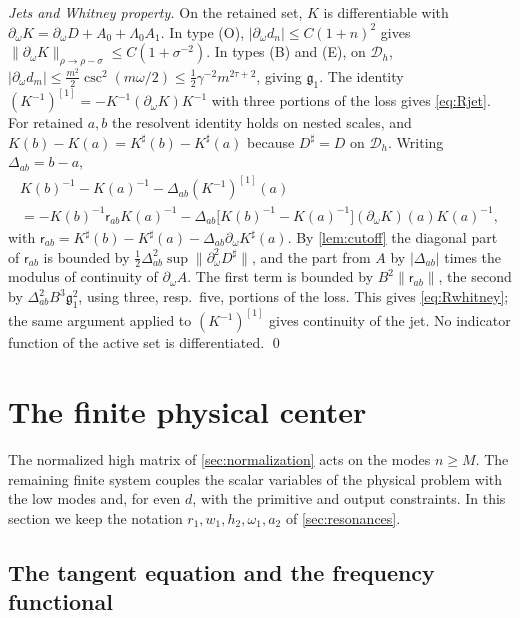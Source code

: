 \documentclass[11pt]{amsart}
\numberwithin{equation}{section}
\theoremstyle{definition}
\theoremstyle{remark}
\newcommand{\abs}[1]{\lvert #1\rvert}
\newcommand{\norm}[1]{\lVert #1\rVert}
\newcommand{\Dh}{\mathcal D_h}
\begin{document}
\emph{Jets and Whitney property.} On the retained set, $K$ is differentiable with $\partial_\omega K=\partial_\omega D+A_0+\Lambda_0A_1$. In type (O), $\abs{\partial_\omega d_n}\le C(1+n)^2$ gives $\norm{\partial_\omega K}_{\rho\to\rho-\sigma}\le C(1+\sigma^{-2})$. In types (B) and (E), on $\Dh$, $\abs{\partial_\omega d_m}\le\frac{m^2}2\csc^2(m\omega/2)\le\frac12\gamma^{-2}m^{2\tau+2}$, giving $\mathfrak g_1$. The identity $(K^{-1})^{[1]}=-K^{-1}(\partial_\omega K)K^{-1}$ with three portions of the loss gives \eqref{eq:Rjet}. For retained $a,b$ the resolvent identity holds on nested scales, and $K(b)-K(a)=K^\sharp(b)-K^\sharp(a)$ because $D^\sharp=D$ on $\Dh$. Writing $\Delta_{ab}=b-a$,
\begin{multline*}
K(b)^{-1}-K(a)^{-1}-\Delta_{ab}(K^{-1})^{[1]}(a)\\
=-K(b)^{-1}\mathsf r_{ab}K(a)^{-1}-\Delta_{ab}\bigl[K(b)^{-1}-K(a)^{-1}\bigr](\partial_\omega K)(a)K(a)^{-1},
\end{multline*}
with $\mathsf r_{ab}=K^\sharp(b)-K^\sharp(a)-\Delta_{ab}\partial_\omega K^\sharp(a)$. By \cref{lem:cutoff} the diagonal part of $\mathsf r_{ab}$ is bounded by $\frac12\Delta_{ab}^2\sup\norm{\partial^2_\omega D^\sharp}$, and the part from $A$ by $\abs{\Delta_{ab}}$ times the modulus of continuity of $\partial_\omega A$. The first term is bounded by $B^2\norm{\mathsf r_{ab}}$, the second by $\Delta_{ab}^2B^3\mathfrak g_1^2$, using three, resp.\ five, portions of the loss. This gives \eqref{eq:Rwhitney}; the same argument applied to $(K^{-1})^{[1]}$ gives continuity of the jet. No indicator function of the active set is differentiated. \qed

\section{The finite physical center}\label{sec:center}

The normalized high matrix of \cref{sec:normalization} acts on the modes $n\ge M$. The remaining finite system couples the scalar variables of the physical problem with the low modes and, for even $d$, with the primitive and output constraints. In this section we keep the notation $r_1,w_1,h_2,\omega_1,a_2$ of \cref{sec:resonances}.

\subsection{The tangent equation and the frequency functional}
\end{document}
